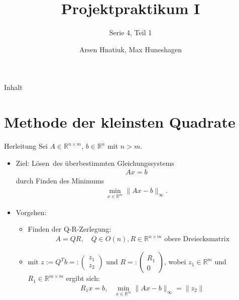 \documentclass{beamer}
\title{Projektpraktikum I}
\subtitle{Serie 4, Teil 1}
\author{Arsen Hnatiuk, Max Huneshagen}
\begin{document}
\begin{frame}
  \maketitle
\end{frame}

\begin{frame}{Inhalt}
  \tableofcontents
\end{frame}

\section{Methode der kleinsten Quadrate}

\begin{frame}{Herleitung}
  Sei $A\in \mathbb{R}^{n\times m}$,  $b\in \mathbb{R}^n$ mit $n>m$.\\
  \begin{itemize}
  \item Ziel: \glqq Lösen\grqq ~des überbestimmten Gleichungssystems 
  \begin{align}
  Ax=b
  \end{align}
  durch Finden des Minimums
  \begin{align}
  \min\limits_{x\in\mathbb{R}^m}\|Ax-b\|_\infty.
  \end{align}\pause
\item Vorgehen:
\begin{itemize}
\item Finden der Q-R-Zerlegung:
\begin{align}
A=QR, \text{~~~}Q\in  O(n), R\in \mathbb{R}^{n\times m}\text{ obere Dreiecksmatrix}
\end{align}
\item mit $z:=Q^Tb=:
\begin{pmatrix}
z_1\\
\hline
z_2
\end{pmatrix}$ und $R=:\begin{pmatrix}
R_1\\
0
\end{pmatrix}$, wobei $z_1\in\mathbb{R}^{m}$ und $R_1\in\mathbb{R}^{m\times m}$ ergibt sich:
\begin{align}
R_1x=b\text{,~~~}  \min\limits_{x\in\mathbb{R}^m}\|Ax-b\|_\infty=\|z_2\|
\end{align}

\end{itemize}
  \end{itemize}
  



\end{frame}
\end{document}
